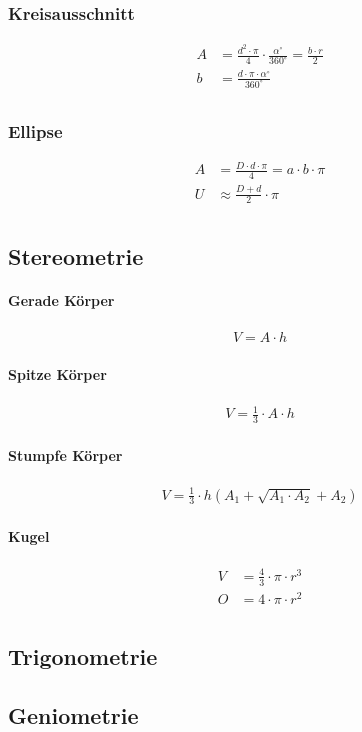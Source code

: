 \subsubsection{Kreisausschnitt}
\begin{align*}
    A &= \frac{d^2 \cdot \pi}{4} \cdot \frac{\alpha^\circ}{360^\circ} = \frac{b \cdot r}{2} \\
    b &= \frac{d \cdot \pi \cdot \alpha^\circ }{ 360^\circ} \\
\end{align*}

\subsubsection{Ellipse}
\begin{align*}
    A &= \frac{D \cdot d \cdot \pi}{4} = a \cdot b \cdot \pi \\
    U &\approx \frac{D+d}{2} \cdot \pi \\
\end{align*}


\subsection{Stereometrie}
\paragraph{Gerade Körper}
\begin{align*}
    V = A \cdot h
\end{align*}

\paragraph{Spitze Körper}
\begin{align*}
    V = \frac{1}{3} \cdot A \cdot h
\end{align*}

\paragraph{Stumpfe Körper}
\begin{align*}
    V = \frac{1}{3} \cdot h ( A_1 + \sqrt{A_1 \cdot A_2} + A_2)
\end{align*}

\paragraph{Kugel}
\begin{align*}
    V &= \frac{4}{3} \cdot \pi \cdot r^3 \\
    O &= 4 \cdot \pi \cdot r^2 \\
\end{align*}

\subsection{Trigonometrie}
\subsection{Geniometrie}